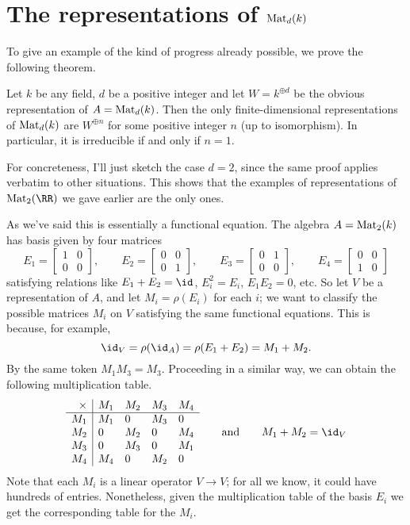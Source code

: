 \section{The representations of $\mathrm{Mat}_d(k)$}
To give an example of the kind of progress already possible,
we prove the following theorem.
\begin{theorem}
	\label{thm:rep_1mat}
	Let $k$ be any field, $d$ be a positive integer and
	let $W = k^{\oplus d}$ be the obvious representation of $A = \mathrm{Mat}_d(k)$.
	Then the only finite-dimensional representations
	of $\mathrm{Mat}_d(k)$ are $W^{\oplus n}$
	for some positive integer $n$ (up to isomorphism).
	In particular, it is irreducible if and only if $n=1$.
\end{theorem}
For concreteness, I'll just sketch the case $d=2$,
since the same proof applies verbatim to other situations.
This shows that the examples of representations of $\Mat_2(\RR)$
we gave earlier are the only ones.

As we've said this is essentially a functional equation.
The algebra $A = \mathrm{Mat}_2(k)$ has basis given by four matrices
\[
	E_1 = \begin{bmatrix} 1 & 0 \\ 0 & 0 \end{bmatrix},
	\qquad
	E_2 = \begin{bmatrix} 0 & 0 \\ 0 & 1 \end{bmatrix},
	\qquad
	E_3 = \begin{bmatrix} 0 & 1 \\ 0 & 0 \end{bmatrix},
	\qquad
	E_4 = \begin{bmatrix} 0 & 0 \\ 1 & 0 \end{bmatrix}
\]
satisfying relations like $E_1 + E_2 = \id$, $E_i^2 = E_i$, $E_1E_2 = 0$, etc.
So let $V$ be a representation of $A$, and let $M_i = \rho(E_i)$ for each $i$;
we want to classify the possible matrices $M_i$ on $V$
satisfying the same functional equations.
This is because, for example,
\[ \id_V = \rho(\id_A) = \rho(E_1+E_2) = M_1 + M_2. \]
By the same token $M_1M_3 = M_3$.
Proceeding in a similar way, we can obtain the following multiplication table.
\[
	\begin{array}{r|llll}
		\times & M_1 & M_2 & M_3 & M_4 \\ \hline
		M_1 & M_1 & 0 & M_3 & 0 \\
		M_2 & 0 & M_2 & 0 & M_4 \\
		M_3 & 0 & M_3 & 0 & M_1 \\
		M_4 & M_4 & 0 & M_2 & 0
	\end{array}
	\qquad \text{and} \qquad
	M_1 + M_2 = \id_V
\]
Note that each $M_i$ is a linear operator $V \to V$;
for all we know, it could have hundreds of entries.
Nonetheless, given the multiplication table of the basis $E_i$
we get the corresponding table for the $M_i$.

